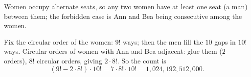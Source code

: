 Women occupy alternate seats, so any two women have at least one seat (a man) between them; the forbidden case is Ann and Bea being consecutive among the women.

Fix the circular order of the women: $9!$ ways; then the men fill the $10$ gaps in $10!$ ways. Circular orders of women with Ann and Bea adjacent: glue them ($2$ orders), $8!$ circular orders, giving $2\cdot8!$. So the count is
\[(9!-2\cdot8!)\cdot10!=7\cdot8!\cdot10!=\boxed{1{,}024{,}192{,}512{,}000}.\]
